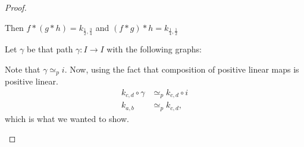 \begin{proof}
\begin{itemize}
            Then $f*(g*h) = k_{\frac{1}{2}, \frac{3}{4}}$ and $(f*g)*h = k_{\frac{1}{4}, \frac{1}{2}}$

            Let $\gamma$ be that path $\gamma:I \to  I$ with the following graphs:

            Note  that $\gamma \simeq_p i$.
            Now, using the fact that composition of positive linear maps is positive linear.
            \begin{align*}
                k_{c, d}  \circ  \gamma &\simeq_p  k_{c, d}  \circ i\\
                k_{a, b} &\simeq_p  k_{c, d},
            \end{align*} 
            which is what we wanted to show.
    \end{itemize}
\end{proof}

